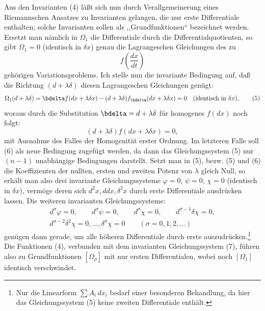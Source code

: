 \documentclass[11pt]{article}
\begin{document}
Aus den Invarianten (4) läßt sich nun durch Verallgemeinerung eines
Riemannschen Ansatzes zu Invarianten gelangen, die nur erste
Differentiale enthalten; solche Invarianten sollen als
,,Grundfunktionen`` bezeichnet werden. Ersetzt man nämlich in
\(\Omega_1\) die Differentiale durch die Differentialquotienten, so gibt
\(\Omega_1=0\) (identisch in \(\delta x\)) genau die Lagrangeschen
Gleichungen des zu
\[
f\!\left(\frac{dx}{dt}\right)
\]
gehörigen Variationsproblems. Ich stelle nun die invariante Bedingung
auf, daß die Richtung \((d+\lambda\delta)\) diesen Lagrangeschen
Gleichungen genügt:
\begin{equation}
\Omega_1(d+\lambda\delta)=
\bdelta f(dx+\lambda\delta x)
-(d+\lambda\delta)f_{\bdelta}(dx+\lambda\delta x)=0
\quad(\text{identisch in }\delta x),
\tag{5}
\end{equation}
woraus durch die Substitution \(\bdelta=d+\lambda\delta\) für
homogenes \(f(dx)\) noch folgt:
\begin{equation}
(d+\lambda\delta)f(dx+\lambda\delta x)=0,
\tag{6}
\end{equation}
mit Ausnahme des Falles der Homogenität erster Ordnung. Im letzteren
Falle soll (6) als neue Bedingung zugefügt werden, da dann das
Gleichungssystem (5) nur \((n-1)\) unabhängige Bedingungen darstellt.
Setzt man in (5), bezw. (5) und (6) die Koeffizienten der nullten,
ersten und zweiten Potenz von \(\lambda\) gleich Null, so erhält man
also drei invariante Gleichungssysteme
\(\varphi=0\), \(\psi=0\), \(\chi=0\) (identisch in \(\delta x\)),
vermöge deren sich \(d^2x,ddx,\delta^2x\) durch erste Differentiale
ausdrücken lassen. Die weiteren invarianten Gleichungssysteme:
\begin{equation}
\begin{gathered}
d^\sigma\varphi=0,\qquad d^\sigma\psi=0,\qquad
d^\sigma\chi=0,\qquad d^{\sigma-1}\delta\chi=0,\\
d^{\sigma-2}\delta^2\chi=0,\ldots,\delta^\sigma\chi=0
\qquad(\sigma=0,1,2,\ldots)
\end{gathered}
\tag{7}
\end{equation}
genügen dann gerade, um alle höheren Differentiale durch erste
auszudrücken.\footnote{Nur die Linearform \(\sum A_i\,dx_i\) bedarf
einer besonderen Behandlung, da hier das Gleichungssystem (5) keine
zweiten Differentiale enthält.} Die Funktionen (4), verbunden mit dem
invarianten Gleichungssystem (7), führen also zu Grundfunktionen
\([\Omega_\rho]\) mit nur ersten Differentialen, wobei noch
\([\Omega_1]\) identisch verschwindet.
\end{document}
